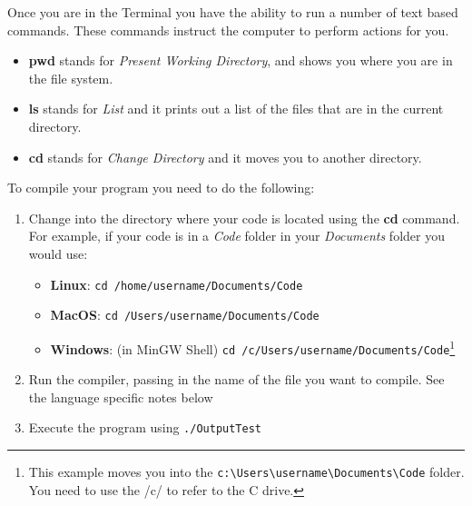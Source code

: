 Once you are in the Terminal you have the ability to run a number of text based commands. These commands instruct the computer to perform actions for you.

\begin{itemize}
  \item \textbf{pwd} stands for \emph{Present Working Directory}, and shows you where you are in the file system.
  \item \textbf{ls} stands for \emph{List} and it prints out a list of the files that are in the current directory.
  \item \textbf{cd} stands for \emph{Change Directory} and it moves you to another directory. 
\end{itemize}

To compile your program you need to do the following:

\begin{enumerate}
  \item Change into the directory where your code is located using the \textbf{cd} command. For example, if your code is in a \emph{Code} folder in your \emph{Documents} folder you would use:
  \begin{itemize}
    \item \textbf{Linux}: \texttt{cd /home/username/Documents/Code}
    \item \textbf{MacOS}: \texttt{cd /Users/username/Documents/Code}
    \item \textbf{Windows}: (in MinGW Shell) \texttt{cd /c/Users/username/Documents/Code}\footnote{This example moves you into the \texttt{c:{\textbackslash}Users{\textbackslash}username{\textbackslash}Documents{\textbackslash}Code} folder. You need to use the /c/ to refer to the C drive. }
  \end{itemize} 
  \item Run the compiler, passing in the name of the file you want to compile. See the language specific notes below
  \item Execute the program using \texttt{./OutputTest}
\end{enumerate}



